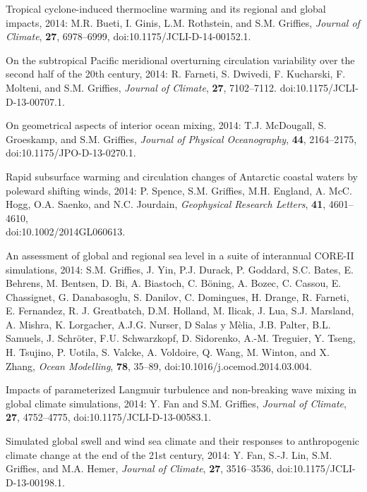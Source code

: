 \begin{etaremune}
\item Tropical cyclone-induced thermocline warming and its regional and global impacts, 2014: M.R. Bueti, I. Ginis, L.M. Rothstein, and S.M. Grif\/f\/ies, {\it Journal of Climate}, {\bf 27},
  6978--6999, doi:10.1175/JCLI-D-14-00152.1.

\item On the subtropical Pacific meridional overturning circulation variability over the second half of the 20th century, 2014:  R. Farneti, S. Dwivedi, F. Kucharski, F. Molteni, and S.M. Grif\/f\/ies, {\it Journal of Climate}, {\bf 27}, 7102--7112.  doi:10.1175/JCLI-D-13-00707.1.

\item On geometrical aspects of interior ocean mixing, 2014:  T.J. McDougall, S. Groeskamp, and S.M. Grif\/f\/ies, {\it Journal of Physical Oceanography}, {\bf 44}, 2164--2175, doi:10.1175/JPO-D-13-0270.1.

\item Rapid subsurface warming and circulation changes of Antarctic coastal waters by poleward shifting winds, 2014: P. Spence, S.M. Grif\/f\/ies, M.H. England, A. McC. Hogg, O.A. Saenko, and N.C. Jourdain, {\it Geophysical Research Letters}, {\bf 41}, 4601--4610, \\  doi:10.1002/2014GL060613.

\item An assessment of global and regional sea level in a suite of interannual CORE-II simulations, 2014: S.M. Grif\/f\/ies, J. Yin, P.J. Durack, P. Goddard, S.C. Bates, E. Behrens, M. Bentsen,  D. Bi, A. Biastoch, C. B\"oning, A. Bozec, C. Cassou, E. Chassignet,
  G. Danabasoglu, S. Danilov, C. Domingues, H. Drange, R. Farneti,  E. Fernandez, R. J. Greatbatch, D.M. Holland, M. Ilicak, J. Lua,
  S.J. Marsland, A. Mishra, K. Lorgacher, A.J.G. Nurser, D Salas y  M\`elia, J.B.  Palter, B.L. Samuels, J. Schr\"oter, F.U. Schwarzkopf, D. Sidorenko, A.-M. Treguier, Y. Tseng,  H. Tsujino, P. Uotila, S. Valcke, A. Voldoire, Q. Wang, M. Winton,  and X. Zhang, {\it Ocean Modelling}, {\bf 78}, 35--89,
  doi:10.1016/j.ocemod.2014.03.004.

\item Impacts of parameterized Langmuir turbulence and non-breaking wave mixing in global climate simulations, 2014: Y. Fan and S.M. Grif\/f\/ies, {\it Journal of Climate}, {\bf 27},  4752--4775, doi:10.1175/JCLI-D-13-00583.1.

\item Simulated global swell and wind sea climate and their responses to anthropogenic climate change at the end of the 21st century,  2014: Y. Fan, S.-J. Lin, S.M. Grif\/f\/ies, and M.A. Hemer, {\it Journal of Climate}, {\bf 27}, 3516--3536, doi:10.1175/JCLI-D-13-00198.1.


\end{etaremune}
